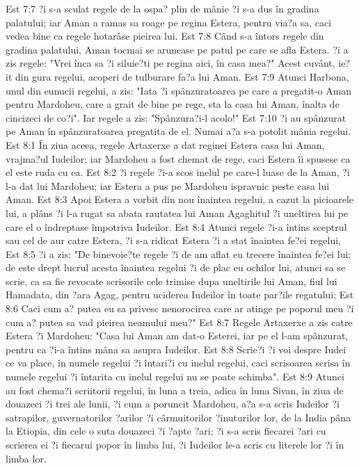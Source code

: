 Est 7:7  ?i s-a sculat regele de la ospa? plin de mânie ?i s-a dus în gradina palatului; iar Aman a ramas sa roage pe regina Estera, pentru via?a sa, caci vedea bine ca regele hotarâse pieirea lui.
Est 7:8  Când s-a întors regele din gradina palatului, Aman tocmai se aruncase pe patul pe care se afla Estera. ?i a zis regele: "Vrei înca sa ?i siluie?ti pe regina aici, în casa mea?" Acest cuvânt, ie?it din gura regelui, acoperi de tulburare fa?a lui Aman.
Est 7:9  Atunci Harbona, unul din eunucii regelui, a zis: "Iata ?i spânzuratoarea pe care a pregatit-o Aman pentru Mardoheu, care a grait de bine pe rege, sta la casa lui Aman, înalta de cincizeci de co?i". Iar regele a zis: "Spânzura?i-l acolo!"
Est 7:10  ?i au spânzurat pe Aman în spânzuratoarea pregatita de el. Numai a?a s-a potolit mânia regelui.
Est 8:1  În ziua aceea, regele Artaxerxe a dat reginei Estera casa lui Aman, vrajma?ul Iudeilor; iar Mardoheu a fost chemat de rege, caci Estera îi spusese ca el este ruda cu ea.
Est 8:2  ?i regele ?i-a scos inelul pe care-l luase de la Aman, ?i l-a dat lui Mardoheu; iar Estera a pus pe Mardoheu ispravnic peste casa lui Aman.
Est 8:3  Apoi Estera a vorbit din nou înaintea regelui, a cazut la picioarele lui, a plâns ?i l-a rugat sa abata rautatea lui Aman Agaghitul ?i uneltirea lui pe care el o îndreptase împotriva Iudeilor.
Est 8:4  Atunci regele ?i-a întins sceptrul sau cel de aur catre Estera, ?i s-a ridicat Estera ?i a stat înaintea fe?ei regelui,
Est 8:5  ?i a zis: "De binevoie?te regele ?i de am aflat eu trecere înaintea fe?ei lui; de este drept lucrul acesta înaintea regelui ?i de plac eu ochilor lui, atunci sa se scrie, ca sa fie revocate scrisorile cele trimise dupa uneltirile lui Aman, fiul lui Hamadata, din ?ara Agag, pentru uciderea Iudeilor în toate par?ile regatului;
Est 8:6  Caci cum a? putea eu sa privesc nenorocirea care ar atinge pe poporul meu ?i cum a? putea sa vad pieirea neamului meu?"
Est 8:7  Regele Artaxerxe a zis catre Estera ?i Mardoheu: "Casa lui Aman am dat-o Esterei, iar pe el l-am spânzurat, pentru ca ?i-a întins mâna sa asupra Iudeilor.
Est 8:8  Scrie?i ?i voi despre Iudei ce va place, în numele regelui ?i întari?i cu inelul regelui, caci scrisoarea scrisa în numele regelui ?i întarita cu inelul regelui nu se poate schimba".
Est 8:9  Atunci au fost chema?i scriitorii regelui, în luna a treia, adica în luna Sivan, în ziua de douazeci ?i trei ale lunii, ?i cum a poruncit Mardoheu, a?a s-a scris Iudeilor ?i satrapilor, guvernatorilor ?arilor ?i cârmuitorilor ?inuturilor lor, de la India pâna la Etiopia, din cele o suta douazeci ?i ?apte ?ari; ?i s-a scris fiecarei ?ari cu scrierea ei ?i fiecarui popor în limba lui, ?i Iudeilor le-a scris cu literele lor ?i în limba lor.
